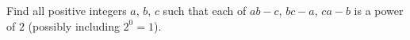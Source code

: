 Find all positive integers $a$, $b$, $c$ such that
each of $ab-c$, $bc-a$, $ca-b$ is a power of $2$
(possibly including $2^0=1$).